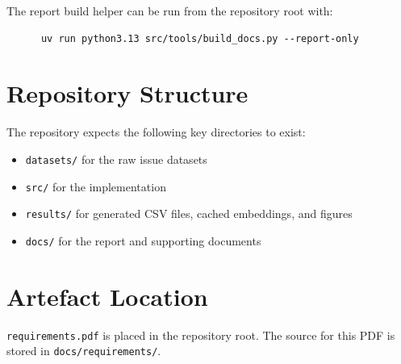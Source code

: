 \documentclass[10pt,a4paper]{article}
\begin{document}
The report build helper can be run from the repository root with:

\begin{verbatim}
      uv run python3.13 src/tools/build_docs.py --report-only
\end{verbatim}

\section{Repository Structure}
The repository expects the following key directories to exist:
\begin{itemize}
      \item \texttt{datasets/} for the raw issue datasets
      \item \texttt{src/} for the implementation
      \item \texttt{results/} for generated CSV files, cached embeddings, and figures
      \item \texttt{docs/} for the report and supporting documents
\end{itemize}

\section{Artefact Location}
\texttt{requirements.pdf} is placed in the repository root. The source for this PDF is stored in \texttt{docs/requirements/}.
\end{document}
